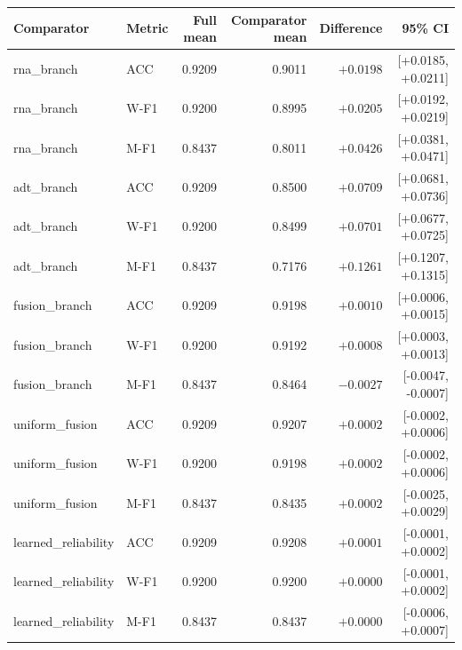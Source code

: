 \begin{tabular}{llrrrr}
\toprule
Comparator & Metric & Full mean & Comparator mean & Difference & 95\% CI \\
\midrule
rna\_branch & ACC & 0.9209 & 0.9011 & $+0.0198$ & [+0.0185, +0.0211] \\
rna\_branch & W-F1 & 0.9200 & 0.8995 & $+0.0205$ & [+0.0192, +0.0219] \\
rna\_branch & M-F1 & 0.8437 & 0.8011 & $+0.0426$ & [+0.0381, +0.0471] \\
adt\_branch & ACC & 0.9209 & 0.8500 & $+0.0709$ & [+0.0681, +0.0736] \\
adt\_branch & W-F1 & 0.9200 & 0.8499 & $+0.0701$ & [+0.0677, +0.0725] \\
adt\_branch & M-F1 & 0.8437 & 0.7176 & $+0.1261$ & [+0.1207, +0.1315] \\
fusion\_branch & ACC & 0.9209 & 0.9198 & $+0.0010$ & [+0.0006, +0.0015] \\
fusion\_branch & W-F1 & 0.9200 & 0.9192 & $+0.0008$ & [+0.0003, +0.0013] \\
fusion\_branch & M-F1 & 0.8437 & 0.8464 & $-0.0027$ & [-0.0047, -0.0007] \\
uniform\_fusion & ACC & 0.9209 & 0.9207 & $+0.0002$ & [-0.0002, +0.0006] \\
uniform\_fusion & W-F1 & 0.9200 & 0.9198 & $+0.0002$ & [-0.0002, +0.0006] \\
uniform\_fusion & M-F1 & 0.8437 & 0.8435 & $+0.0002$ & [-0.0025, +0.0029] \\
learned\_reliability & ACC & 0.9209 & 0.9208 & $+0.0001$ & [-0.0001, +0.0002] \\
learned\_reliability & W-F1 & 0.9200 & 0.9200 & $+0.0000$ & [-0.0001, +0.0002] \\
learned\_reliability & M-F1 & 0.8437 & 0.8437 & $+0.0000$ & [-0.0006, +0.0007] \\
\bottomrule
\end{tabular}
